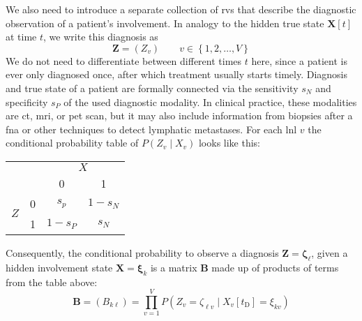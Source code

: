 \documentclass[twocolumn]{aastex631}
\begin{document}
We also need to introduce a separate collection of \glspl{rv} that describe the diagnostic observation of a patient's involvement. In analogy to the hidden true state $\mathbf{X}[t]$ at time $t$, we write this diagnosis as
%
\begin{equation}
    \mathbf{Z} = \left( Z_v \right) \qquad v \in \left\{ 1,2, \ldots, V \right\}
\end{equation}
%
We do not need to differentiate between different times $t$ here, since a patient is ever only diagnosed once, after which treatment usually starts timely.
Diagnosis and true state of a patient are formally connected via the sensitivity $s_N$ and specificity $s_P$ of the used diagnostic modality. In clinical practice, these modalities are \gls{ct}, \gls{mri}, or \gls{pet} scan, but it may also include information from biopsies after a \gls{fna} or other techniques to detect lymphatic metastases. For each \gls{lnl} $v$ the conditional probability table of $P\left( Z_v \mid X_v \right)$ looks like this:

\noindent
\begin{center}
    \begin{tabular}{|cc|cc|}
        \hline
        & & \multicolumn{2}{c|}{$X$} \\
        & & 0 & 1 \\
        \hline
        \multirow{2}{*}{$Z$} & 0 & $s_p$ & $1 - s_N$ \\
        & 1 & $1 - s_P$ & $s_N$ \\
        \hline
    \end{tabular}
\end{center}

Consequently, the conditional probability to observe a diagnosis $\mathbf{Z}=\boldsymbol{\zeta}_\ell$, given a hidden involvement state $\mathbf{X}=\boldsymbol{\xi}_k$ is a matrix $\mathbf{B}$ made up of products of terms from the table above:
%
\begin{equation} \label{eq:transition_matrix}
    \mathbf{B} = \left( B_{k\ell} \right) = \prod_{v=1}^V P\left( Z_v = \zeta_{\ell v} \mid X_v[t_\text{D}] = \xi_{kv} \right)
\end{equation}
\end{document}
